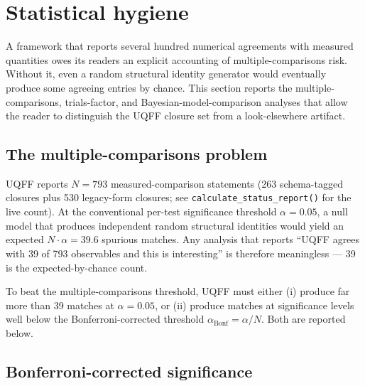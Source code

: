 
\section{Statistical hygiene}
\label{sec:statistics}

A framework that reports several hundred numerical agreements with
measured quantities owes its readers an explicit accounting of
multiple-comparisons risk. Without it, even a random structural
identity generator would eventually produce some agreeing entries
by chance. This section reports the multiple-comparisons,
trials-factor, and Bayesian-model-comparison analyses that allow the
reader to distinguish the UQFF closure set from a look-elsewhere
artifact.

\subsection{The multiple-comparisons problem}
\label{sec:multiple_comparisons}

UQFF reports $N=793$ measured-comparison statements
(263 schema-tagged closures plus 530 legacy-form closures; see
\texttt{calculate\_status\_report()} for the live count). At the
conventional per-test significance threshold $\alpha = 0.05$, a null
model that produces independent random structural identities would
yield an expected $N \cdot \alpha = 39.6$ spurious matches. Any
analysis that reports ``UQFF agrees with 39 of 793 observables and
this is interesting'' is therefore meaningless --- 39 is the
expected-by-chance count.

To beat the multiple-comparisons threshold, UQFF must either
(i) produce far more than 39 matches at $\alpha = 0.05$, or
(ii) produce matches at significance levels well below the
Bonferroni-corrected threshold $\alpha_{\text{Bonf}} = \alpha/N$.
Both are reported below.

\subsection{Bonferroni-corrected significance}
\label{sec:bonferroni}

